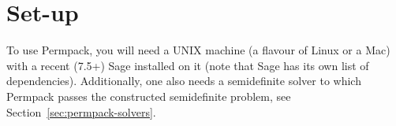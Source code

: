 



\section{Set-up}
\label{sec:permpack-setup}

To use Permpack, you will need a UNIX machine (a flavour of Linux or a Mac) with a recent (7.5+) Sage installed on it (note that Sage has its own list of dependencies). Additionally, one also needs a semidefinite solver to which Permpack passes the constructed semidefinite problem, see Section~\ref{sec:permpack-solvers}.

